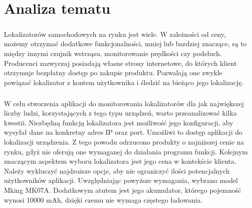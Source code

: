\chapter{Analiza tematu}

\paragraph{}
Lokalizatorów samochodowych na rynku jest wiele. W zależności od ceny, możemy otrzymać dodatkowe funkcjonalności, mniej lub bardziej znaczące, są to między innymi czujnik wstrząsu, monitorowanie prędkości czy podsłuch. Producenci zazwyczaj posiadają własne strony internetowe, do których klient otrzymuje bezpłatny dostęp po zakupie produktu. Pozwalają one zwykle powiązać lokalizator z kontem użytkownika i śledzić na bieżąco jego lokalizację.

\paragraph{}
W celu stworzenia aplikacji do monitorowania lokalizatorów dla jak największej liczby ludzi, korzystających z tego typu urządzeń, warto przeanalizować kilka kwestii. Niezbędną funkcją lokalizatora jest możliwość jego konfiguracji, aby wysyłał dane na konkretny adres IP oraz port. Umożliwi to dostęp aplikacji do lokalizacji urządzenia. Z tego powodu odrzucono produkty o najniższej cenie na rynku, gdyż nie oferują one wymaganej do działania programu funkcji. Kolejnym znaczącym aspektem wyboru lokalizatora jest jego cena w kontekście klienta. Należy wykluczyć najdroższe opcje, aby nie ograniczyć ilości potencjalnych użytkowników aplikacji. Uwzględniając powyższe wymagania, wybrano model Mking MK07A. Dodatkowym atutem jest jego akumulator, którego pojemność wynosi 10000 mAh, dzięki czemu nie wymaga częstego ładowania.

